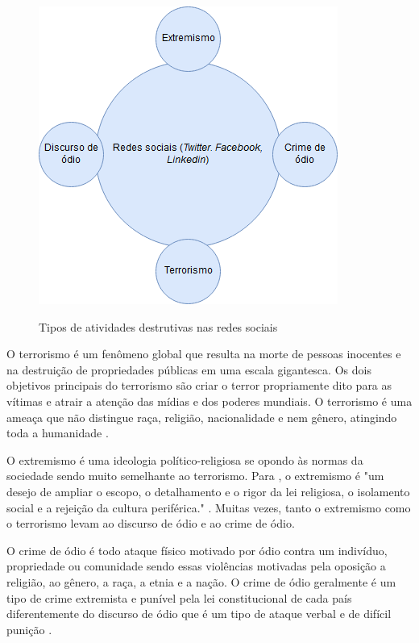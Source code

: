 \begin{figure}[!h]
\centering 
\caption{Tipos de atividades destrutivas nas redes sociais}
\includegraphics[scale=0.70]{imagens/atividadesdestrutivas.png}
\label{fig:atividadesdestrutivas}
\end{figure}

O terrorismo é um fenômeno global que resulta na morte de pessoas inocentes e na destruição de propriedades públicas em uma escala gigantesca. Os dois objetivos principais do terrorismo são criar o terror propriamente dito para as vítimas e atrair a atenção das mídias e dos poderes mundiais. O terrorismo é uma ameaça que não distingue raça, religião, nacionalidade e nem gênero, atingindo toda a humanidade \cite{Chetty2018}.

O extremismo é uma ideologia político-religiosa se opondo às normas da sociedade sendo muito semelhante ao terrorismo. Para , o extremismo é "um desejo de ampliar o escopo, o detalhamento e o rigor da lei religiosa, o isolamento social e a rejeição da cultura periférica." \cite{Liebman1983,Chetty2018}. Muitas vezes, tanto o extremismo como o terrorismo levam ao discurso de ódio e ao crime de ódio.

O crime de ódio é todo ataque físico motivado por ódio contra um indivíduo, propriedade ou comunidade sendo essas violências motivadas pela oposição a religião, ao gênero, a raça, a etnia e a nação. O crime de ódio geralmente é um tipo de crime extremista e punível pela lei constitucional de cada país diferentemente do discurso de ódio que é um tipo de ataque verbal e de difícil punição \cite{Chetty2018}.

